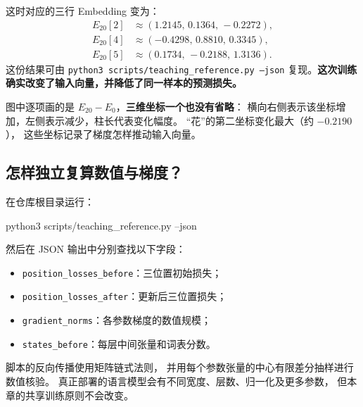 \label{sec:embedding-training-snapshot}
这时对应的三行 Embedding 变为：
\[
\begin{aligned}
E_{20}[2]&\approx(1.2145,\,0.1364,\,-0.2272),\\
E_{20}[4]&\approx(-0.4298,\,0.8810,\,0.3345),\\
E_{20}[5]&\approx(0.1734,\,-0.2188,\,1.3136).
\end{aligned}
\]
这份结果可由 \texttt{python3 scripts/teaching\_reference.py --json}
复现。\textbf{这次训练确实改变了输入向量，并降低了同一样本的预测损失。}

\par\medskip
\Needspace{74mm} %


图中逐项画的是 $E_{20}-E_0$，\textbf{三维坐标一个也没有省略}：
横向右侧表示该坐标增加，左侧表示减少，柱长代表变化幅度。
“花”的第二坐标变化最大（约 $-0.2190$），
这些坐标记录了梯度怎样推动输入向量。


\subsection{怎样独立复算数值与梯度？}

在仓库根目录运行：
\begin{center}
\small\ttfamily
python3 scripts/teaching\_reference.py --json
\end{center}
然后在 JSON 输出中分别查找以下字段：
\begin{itemize}
\item \texttt{position\_losses\_before}：三位置初始损失；
\item \texttt{position\_losses\_after}：更新后三位置损失；
\item \texttt{gradient\_norms}：各参数梯度的数值规模；
\item \texttt{states\_before}：每层中间张量和词表分数。
\end{itemize}
脚本的反向传播使用矩阵链式法则，
并用每个参数张量的中心有限差分抽样进行数值核验。
真正部署的语言模型会有不同宽度、层数、归一化及更多参数，
但本章的共享训练原则不会改变。

